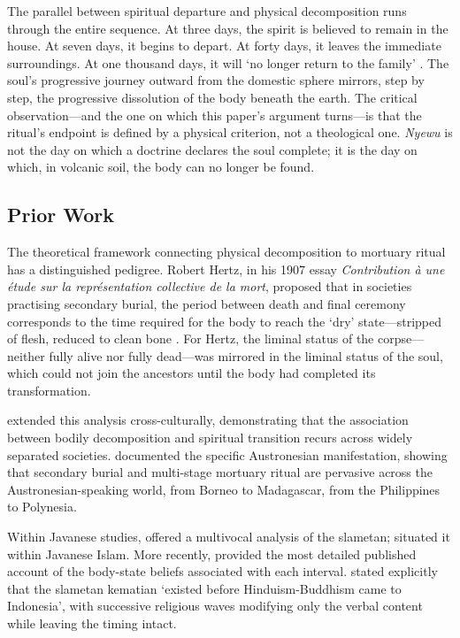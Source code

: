 \documentclass[12pt,a4paper]{article}
\begin{document}
The parallel between spiritual departure and physical decomposition runs through the entire sequence. At three days, the spirit is believed to remain in the house. At seven days, it begins to depart. At forty days, it leaves the immediate surroundings. At one thousand days, it will `no longer return to the family' \citep[440]{hendrajaya_2020}. The soul's progressive journey outward from the domestic sphere mirrors, step by step, the progressive dissolution of the body beneath the earth. The critical observation---and the one on which this paper's argument turns---is that the ritual's endpoint is defined by a physical criterion, not a theological one. \textit{Nyewu} is not the day on which a doctrine declares the soul complete; it is the day on which, in volcanic soil, the body can no longer be found.

\subsection{Prior Work}

The theoretical framework connecting physical decomposition to mortuary ritual has a distinguished pedigree. Robert Hertz, in his 1907 essay \textit{Contribution \`{a} une \'{e}tude sur la repr\'{e}sentation collective de la mort}, proposed that in societies practising secondary burial, the period between death and final ceremony corresponds to the time required for the body to reach the `dry' state---stripped of flesh, reduced to clean bone \citep{hertz_1907}. For Hertz, the liminal status of the corpse---neither fully alive nor fully dead---was mirrored in the liminal status of the soul, which could not join the ancestors until the body had completed its transformation.

\citet{bloch_parry_1982} extended this analysis cross-culturally, demonstrating that the association between bodily decomposition and spiritual transition recurs across widely separated societies. \citet{metcalf_huntington_1991} documented the specific Austronesian manifestation, showing that secondary burial and multi-stage mortuary ritual are pervasive across the Austronesian-speaking world, from Borneo to Madagascar, from the Philippines to Polynesia.

Within Javanese studies, \citet{beatty_1999} offered a multivocal analysis of the slametan; \citet{woodward_1989} situated it within Javanese Islam. More recently, \citet{hendrajaya_2020} provided the most detailed published account of the body-state beliefs associated with each interval. \citet[149]{aizid_2015} stated explicitly that the slametan kematian `existed before Hinduism-Buddhism came to Indonesia', with successive religious waves modifying only the verbal content while leaving the timing intact.
\end{document}
